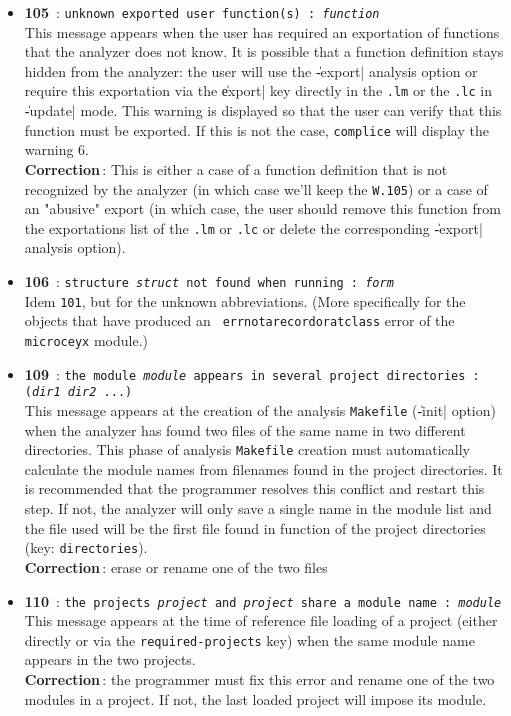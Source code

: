\begin{itemize}
\item {\Large {\bf 105}}\ : {\tt unknown exported user function(s) : {\em function}}\\
This message appears when the user has required an exportation of functions that the analyzer does not know.  It is possible that a function definition stays hidden from the analyzer:  the user will use the \|-export| analysis option or require this exportation via the \|export| key directly in the {\tt .lm} or the {\tt .lc} in \|-update| mode.
This warning is displayed so that the user can verify that this function must be exported.  If this is not the case, {\tt complice} will display the warning 6.\\
{\bf Correction}\,: This is either a case of a function definition that is not recognized by the analyzer (in which case we'll keep the {\tt W.105}) or a case of an "abusive" export (in which case, the user should remove this function from the exportations list of the {\tt .lm} or {\tt .lc} or delete the corresponding \|-export| analysis option).

\item {\Large {\bf 106}}\ : {\tt structure {\em struct} not found when
running : {\em form}}\\
Idem {\tt 101},  but for the unknown abbreviations.  (More specifically for the objects that have produced an {\tt
errnotarecordoratclass} error of the {\tt microceyx} module.)

\item {\Large {\bf 109}}\ : {\tt the module {\em module} appears in several
project directories : ({\em dir1} {\em dir2} ...)}\\
This message appears at the creation of the analysis {\tt Makefile} (\|-init| option) when the analyzer has found two files of the same name in two different directories.  This phase of analysis {\tt Makefile} creation must automatically calculate the module names from filenames found in the project directories.  It is recommended that the programmer resolves this conflict and restart this step.  If not, the analyzer will only save a single name in the module list and the file used will be the first file found in function of the project directories (key:  {\tt directories}).\\
{\bf Correction}\,: erase or rename one of the two files

\item {\Large {\bf 110}}\ : {\tt the projects {\em project} and {\em project} share
a module name : {\em module}}\\
This message appears at the time of reference file loading of a project (either directly or via the {\tt required-projects} key) when the same module name appears in the two projects.\\
{\bf Correction}\,: the programmer must fix this error and rename one of the two modules in a project.  If not,
the last loaded project will impose its module.


\end{itemize}

